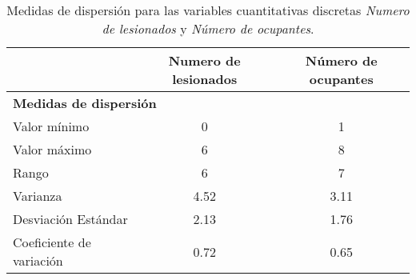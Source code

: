 \begin{table}[!htbp]
    \begin{footnotesize}
        \centering
        \begin{tabular}{lc|c}
            \toprule
            {} & \textbf{Numero de lesionados} & \textbf{Número de ocupantes} \\
            \bottomrule
            \toprule
            \multicolumn{3}{l}{\textbf{Medidas de dispersión}} \\
            \bottomrule
            \toprule
            Valor mínimo & 0 & 1 \\
            \midrule
            Valor máximo & 6 & 8 \\
            \midrule
            Rango & 6 & 7 \\
            \midrule
            Varianza & 4.52 & 3.11 \\
            \midrule
            Desviación Estándar & 2.13 & 1.76 \\
            \midrule
            Coeficiente de variación & 0.72 & 0.65 \\
            \bottomrule
        \end{tabular}
        \caption{\footnotesize{Medidas de dispersión para las variables cuantitativas discretas  \emph{Numero de lesionados} y \emph{Número de ocupantes}.}}
        \label{tab:variablesDiscretasMedidasDispersion}
    \end{footnotesize}
\end{table}

